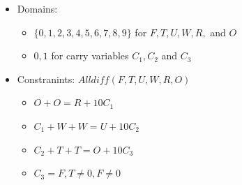 \documentclass[12pt, a4paper]{article}
\begin{document}
\begin{enumerate}
\begin{itemize}
		\item Domains:
		\begin{itemize}
			\item $\{0,1,2,3,4,5,6,7,8,9\}$ for $F, T, U, W, R,$ and $O$
			\item ${0, 1}$ for carry variables $C_1, C_2$ and $C_3$
		\end{itemize}
		\item Constranints: $Alldiff (F,T,U,W,R,O)$
		\begin{itemize}
			\item $O + O = R + 10C_1$
			\item $C_1 + W + W = U + 10C_2$
			\item $C_2 + T + T = O + 10 C_3$
			\item $C_3 = F, T \not = 0, F\not = 0$
		\end{itemize}
	\end{itemize}
	\end{enumerate}
\end{document}
